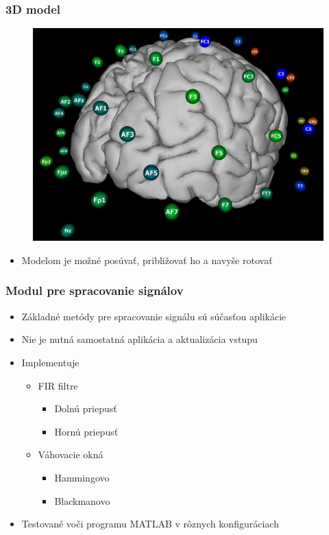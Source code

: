 \documentclass{beamer}
\begin{document}
\begin{frame}
	\frametitle{3D model}
	\begin{figure}
		\centering
		\includegraphics[height=0.7\textheight]{3d.png}
	\end{figure}
	\begin{itemize}
		\item Modelom je možné posúvať, približovať ho a navyše rotovať
	\end{itemize}
\end{frame}

\begin{frame}
	\frametitle{Modul pre spracovanie signálov}
	\begin{itemize}
		\item Základné metódy pre spracovanie signálu sú súčasťou aplikácie
		\item Nie je nutná samostatná aplikácia a aktualizácia vstupu
		\item Implementuje
		\begin{itemize}
			\item FIR filtre
			\begin{itemize}
				\item Dolnú priepusť
				\item Hornú priepusť
			\end{itemize}
			\item Váhovacie okná
			\begin{itemize}
				\item Hammingovo
				\item Blackmanovo
			\end{itemize}
		\end{itemize}
		\item Testované voči programu MATLAB v rôznych konfiguráciach
	\end{itemize}
\end{frame}
\end{document}
